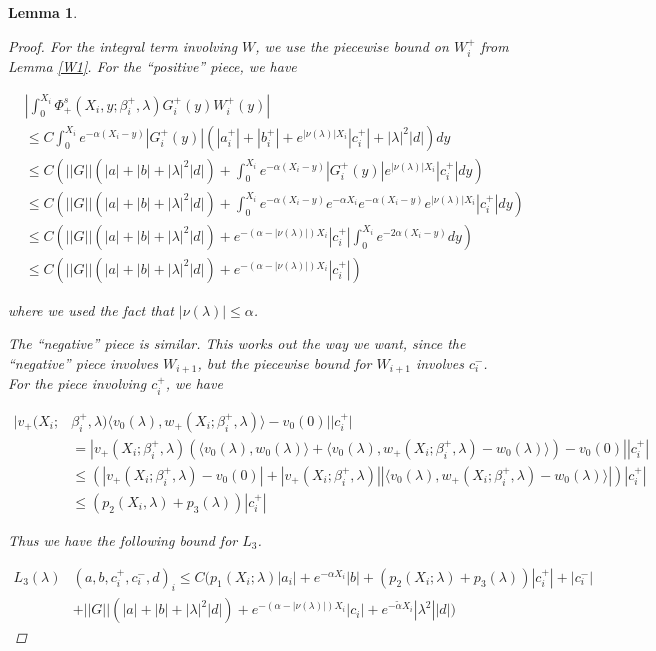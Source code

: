 \documentclass[12pt]{article}
\newtheorem{lemma}{Lemma}
\begin{document}
\begin{lemma}
\begin{proof}
For the integral term involving $W$, we use the piecewise bound on $W_i^+$ from Lemma \ref{W1}. For the ``positive'' piece, we have

\begin{align*}
&\left| \int_0^{X_i} \Phi^s_+(X_i, y; \beta_i^+, \lambda) G_i^+(y) W_i^+(y) \right| \\
&\leq C \int_0^{X_i} e^{-\alpha(X_i - y)}|G_i^+(y)|(|a_i^+| + |b_i^+| + e^{|\nu(\lambda)|X_i}|c_i^+| + |\lambda|^2 |d| ) dy \\
&\leq C \left( ||G||(|a| + |b| + |\lambda|^2 |d|) + \int_0^{X_i} e^{-\alpha(X_i - y)}|G_i^+(y)|e^{|\nu(\lambda)|X_i}|c_i^+| dy \right) \\
&\leq C \left( ||G||(|a| + |b| + |\lambda|^2 |d|) + \int_0^{X_i} e^{-\alpha(X_i - y)}e^{-\alpha X_i} e^{-\alpha(X_i - y)} e^{|\nu(\lambda)|X_i}|c_i^+| dy \right)\\
&\leq C \left( ||G||(|a| + |b| + |\lambda|^2 |d|) + e^{-(\alpha - |\nu(\lambda)|)X_i} |c_i^+| \int_0^{X_i} e^{-2\alpha(X_i - y)} dy \right) \\
&\leq C \left( ||G||(|a| + |b| + |\lambda|^2 |d|) + e^{-(\alpha - |\nu(\lambda)|)X_i} |c_i^+| \right)
\end{align*}

where we used the fact that $|\nu(\lambda)| \leq \alpha$.  

The ``negative'' piece is similar. This works out the way we want, since the ``negative'' piece involves $W_{i+1}$, but the piecewise bound for $W_{i+1}$ involves $c_i^-$.\\

For the piece involving $c_i^+$, we have

\begin{align*}
|v_+(X_i; &\beta_i^+, \lambda) \langle v_0(\lambda), w_+(X_i; \beta_i^+, \lambda) \rangle - v_0(0) | |c_i^+| \\
&= |v_+(X_i; \beta_i^+, \lambda) (\langle v_0(\lambda), w_0(\lambda) \rangle + \langle v_0(\lambda), w_+(X_i; \beta_i^+, \lambda) - w_0(\lambda) \rangle) - v_0(0) | |c_i^+| \\
&\leq (|v_+(X_i; \beta_i^+, \lambda) - v_0(0)| 
+ |v_+(X_i; \beta_i^+, \lambda)||\langle v_0(\lambda), w_+(X_i; \beta_i^+, \lambda) - w_0(\lambda) \rangle|)|c_i^+| \\
&\leq (p_2(X_i, \lambda) + p_3(\lambda))|c_i^+|
\end{align*}

Thus we have the following bound for $L_3$.

\begin{align*}
L_3(\lambda)&(a, b, c_i^+, c_i^-, d)_i \leq C ( p_1(X_i; \lambda)|a_i|
+ e^{-\alpha X_i}|b| + (p_2(X_i; \lambda) + p_3(\lambda))|c_i^+| + |c_i^-| \\
&+ ||G||(|a| + |b| + |\lambda|^2 |d|) + e^{-(\alpha - |\nu(\lambda)|)X_i} |c_i| + e^{-\tilde{\alpha} X_i} |\lambda^2| |d| )
\end{align*}


\end{proof}
\end{lemma}
\end{document}
